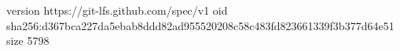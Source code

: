 version https://git-lfs.github.com/spec/v1
oid sha256:d367bca227da5ebab8ddd82ad955520208c58c483fd823661339f3b377d64e51
size 5798
